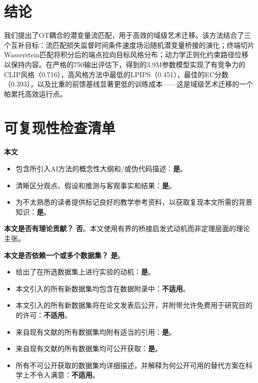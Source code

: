﻿\documentclass[letterpaper]{article}
\begin{document}
\section{结论}
我们提出了OT耦合的潜变量流匹配，用于高效的域级艺术迁移。该方法结合了三个互补目标：流匹配损失监督时间条件速度场沿随机潜变量桥接的演化；终端切片Wasserstein匹配将积分后的端点拉向目标风格分布；动力学正则化约束路径位移以保持内容。在严格的750输出评估下，得到的3.9M参数模型实现了有竞争力的CLIP风格（0.716），高风格方法中最低的LPIPS（0.451），最佳的EC分数（0.393），以及比重的前馈基线显著更低的训练成本——这是域级艺术迁移的一个帕累托高效运行点。

\FloatBarrier


\clearpage
\small
\setlength{\itemsep}{1pt}
\setlength{\parskip}{2pt}
\section*{可复现性检查清单}
\noindent\textbf{本文}
\begin{itemize}
\item 包含所引入AI方法的概念性大纲和/或伪代码描述：\textbf{是}。
\item 清晰区分观点、假设和推测与客观事实和结果：\textbf{是}。
\item 为不太熟悉的读者提供标记良好的教学参考资料，以获取复现本文所需的背景知识：\textbf{是}。
\end{itemize}

\noindent\textbf{本文是否有理论贡献？} \textbf{否}。本文使用有界的桥接启发式动机而非定理层面的理论主张。

\noindent\textbf{本文是否依赖一个或多个数据集？} \textbf{是}。
\begin{itemize}
\item 给出了在所选数据集上进行实验的动机：\textbf{是}。
\item 本文引入的所有新数据集均包含在数据附录中：\textbf{不适用}。
\item 本文引入的所有新数据集将在论文发表后公开，并附带允许免费用于研究目的的许可：\textbf{不适用}。
\item 来自现有文献的所有数据集均附有适当的引用：\textbf{是}。
\item 来自现有文献的所有数据集均可公开获取：\textbf{是}。
\item 所有不可公开获取的数据集均详细描述，并解释为何公开可用的替代方案在科学上不令人满意：\textbf{不适用}。
\end{itemize}
\end{document}
